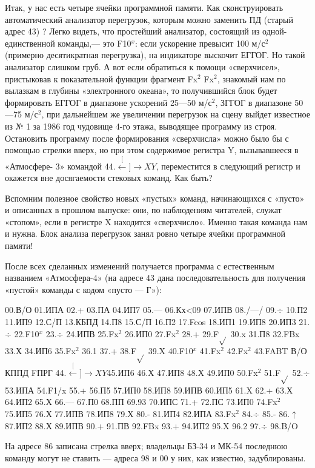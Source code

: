 \documentclass[11pt,a4paper,oneside]{article}
\def\XY{$\stackrel[\leftarrow]{\rightarrow}{XY}$}
\begin{document}
Итак, у нас есть четыре ячейки программной памяти. Как сконструировать автоматический анализатор перегрузок, которым можно заменить ПД (старый адрес 43) ? Легко видеть, что простейший анализатор, состоящий из одной-единственной команды,— это F10$^{x}$: если ускорение превысит 100 м/с$^{2}$ (примерно десятикратная перегрузка), на индикаторе выскочит ЕГГОГ. Но такой анализатор слишком груб. А вот если обратиться к помощи «сверхчисел», пристыковав к показательной функции фрагмент Fx$^{2}$ Fx$^{2}$, знакомый нам по вылазкам в глубины «электронного океана», то получившийся блок будет формировать ЕГГОГ в диапазоне ускорений 25—50	м/с$^{2}$, ЗГГОГ в диапазоне 50—75 м/с$^{2}$, при дальнейшем же увеличении перегрузок на сцену выйдет известное из № 1 за 1986 год чудовище 4-го этажа, выводящее программу из строя. Остановить программу после формирования «сверхчисла» можно было бы с помощью стрелки вверх, но при этом содержимое регистра Y, вызывавшееся в «Атмосфере- 3» командой 44.\XY, переместится в следующий регистр и окажется вне досягаемости стековых команд. Как быть?

Вспомним полезное свойство новых «пустых» команд, начинающихся с «пусто» и описанных в прошлом выпуске: они, по наблюдениям читателей, служат «стопом», если в регистре X находится «сверхчисло». Именно такая команда нам и нужна. Блок анализа перегрузок занял ровно четыре ячейки программной памяти!

После всех сделанных изменений получается программа с естественным названием «Атмосфера-4» (на адресе 43 дана последовательность для получения «пустой» команды с кодом «пусто — Г»):

00.В/О 01.ИПА 02.+ 03.ПА 04.ИП7 05.— 06.Кх<09 07.ИПВ 08./—/ 09.$\div$ 10.П2 11.ИП9 12.С/П 13.КБПД 14.П8 15.С/П 16.П2 17.Fcos 18.ИП1 19.ИП8 20.ИП3 21.$\div$ 22.F10$^{x}$ 23.$\div$ 24.ИПВ 25.Fx$^{2}$ 26.ИП0 27.Fx$^{2}$ 28.+ 29.F$\sqrt{}$ 30.x 31.П8 32.FBx 33.Х 34.ИП6 35.Fx$^{2}$ 36.1 37.+ 38.F$\sqrt{}$ 39.X 40.F10$^{x}$ 41.Fx$^{2}$ 42.Fx$^{2}$ 43.FABT В/О КППД FПРГ 44.\XY 45.ИП6 46.Х 47.ИП8 48.Х 49.ИП0
50.Fx$^{2}$ 51.F$\sqrt{}$ 52.$\div$ 53.ИПА 54.F1/x 55.+ 56.П5 57.ИП0 58.ИП8 59.ИПВ 60.ИП5 61.X 62.+ 63.Х 64.ИП2 65.Х 66.— 67.П0 68.ПП 69.93 70.ИПС 71.+ 72.ПС 73.ИП0 74.Fx$^{2}$ 75.ИП5 76.Х 77.ИПВ 78.ИП8 79.Х 80.- 81.ИП4 82.ИПА 83.Fx$^{2}$ 84.$\div$ 85.- 86.$\uparrow$ 87.ИП2 88.Х 89.ИПВ 90.+ 91.ПВ 92.FBx 93.+ 94.ИП2 95.X 96.2 97.$\div$ 98.B/O

На адресе 86 записана стрелка вверх; владельцы БЗ-34 и МК-54 последнюю команду могут не ставить — адреса 98 и 00 у них, как известно, задублированы.
\end{document}
